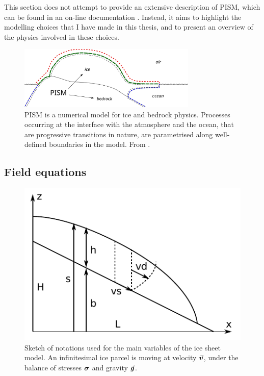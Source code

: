 \documentclass{article}
\newcommand{\vect}[1]{\va*{#1}} %
\newcommand{\tens}[1]{\vb*{#1}} %
\newcommand{\CST}[0]{\tens{\sigma}}     %
\newcommand{\vv}[0]{\vect{v}}           %
\begin{document}
This section does not attempt to provide an extensive description of PISM,
which can be found in an on-line documentation \citep{PISM-authors.2014}.
Instead, it aims to highlight the modelling choices that I have made in this
thesis, and to present an overview of the physics involved in these choices.

\begin{figure}
  \centering
  \includegraphics[width=85mm]{model-interfaces}
  \caption{PISM is a numerical model for ice and bedrock physics. Processes
           occurring at the interface with the atmosphere and the ocean, that
           are progressive transitions in nature, are parametrised along
           well-defined boundaries in the model.
           From \citet{PISM-authors.2014}.}
  \label{fig:model-interfaces}
\end{figure}

\subsection{Field equations}

\begin{figure}
  \centering
  \includegraphics{model-variables}
  \caption{Sketch of notations used for the main variables of the ice sheet
           model. An infinitesimal ice parcel is moving at velocity $\vv$,
           under the balance of stresses $\CST$ and gravity $\vect{g}$.}
  \label{fig:model-variables}
\end{figure}
\end{document}

